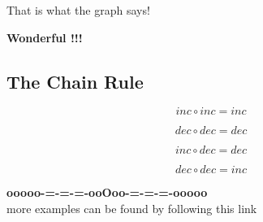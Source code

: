 \documentclass{ximera}
\begin{document}
That is what the graph says! 


\begin{center}
\textbf{\textcolor{red!80!black}{Wonderful !!!}}
\end{center}



\subsection*{The Chain Rule}

\begin{summary}

\[ inc \circ inc = inc \]

\[ dec \circ dec = dec \]

\[ inc \circ dec = dec \]

\[ dec \circ dec = inc \]

\end{summary}








\begin{center}
\textbf{\textcolor{green!50!black}{ooooo-=-=-=-ooOoo-=-=-=-ooooo}} \\

more examples can be found by following this link\\ 

\end{center}
\end{document}
